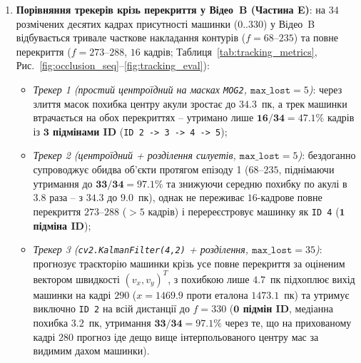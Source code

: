 \documentclass[14pt, a4paper]{extarticle}
\begin{document}
\begin{enumerate}
    \item \textbf{Порівняння трекерів крізь перекриття у Відео~B (Частина E)}: на $34$ розмічених десятих кадрах присутності машинки ($0..330$) у Відео~B відбувається тривале часткове накладання контурів ($f = 68$--$235$) та повне перекриття ($f = 273$--$288$, $16$ кадрів; Таблиця~\ref{tab:tracking_metrics}, Рис.~\ref{fig:occlusion_seq}--\ref{fig:tracking_eval}):
    \begin{itemize}
        \item \textit{Трекер 1 (простий центроїдний на масках \texttt{MOG2}, $\texttt{max\_lost} = 5$)}: через злиття масок похибка центру акули зростає до $34.3$~пк, а трек машинки втрачається на обох перекриттях -- утримано лише $\mathbf{16/34 = 47.1\%}$ кадрів із \textbf{$\mathbf{3}$ підмінами ID} (\texttt{ID 2 -> 3 -> 4 -> 5});
        \item \textit{Трекер 2 (центроїдний + розділення силуетів, $\texttt{max\_lost} = 5$)}: бездоганно супроводжує обидва об'єкти протягом епізоду 1 ($68$--$235$, піднімаючи утримання до $\mathbf{33/34 = 97.1\%}$ та знижуючи середню похибку по акулі в $3.8$ раза -- з $34.3$ до $9.0$~пк), однак не переживає $16$-кадрове повне перекриття $273$--$288$ ($> 5$ кадрів) і перереєстровує машинку як \texttt{ID 4} (\textbf{$\mathbf{1}$ підміна ID});
        \item \textit{Трекер 3 (\texttt{cv2.KalmanFilter(4,2)} + розділення, $\texttt{max\_lost} = 35$)}: прогнозує траєкторію машинки крізь усе повне перекриття за оціненим вектором швидкості $(v_x, v_y)^T$, з похибкою лише $4.7$~пк підхоплює вихід машинки на кадрі $290$ ($x = 1469.9$ проти еталона $1473.1$~пк) та утримує виключно \texttt{ID 2} на всій дистанції до $f=330$ (\textbf{$\mathbf{0}$ підмін ID}, медіанна похибка $\mathbf{3.2}$~пк, утримання $\mathbf{33/34 = 97.1\%}$ через те, що на прихованому кадрі $280$ прогноз іде дещо вище інтерпольованого центру мас за видимим дахом машинки).
    \end{itemize}
\end{enumerate}
\end{document}
